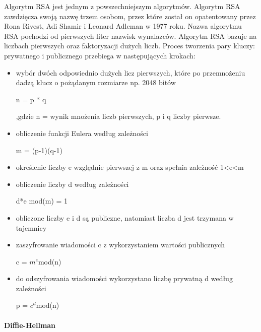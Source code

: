 \documentclass[12p]{article}
\begin{document}
Algorytm RSA jest jednym z powszechniejszym algorytmów. Algorytm RSA zawdzięcza swoją nazwę trzem osobom, przez które został on opatentowany przez Rona Rivest, Adi Shamir i Leonard Adleman w 1977 roku. Nazwa algorytmu RSA pochodzi od pierwszych liter nazwisk wynalazców. Algorytm RSA bazuje na liczbach pierwszych oraz faktoryzacji dużych liczb. Proces tworzenia pary kluczy: prywatnego i publicznego przebiega w następujących krokach:
\begin{itemize}
\item wybór dwóch odpowiednio dużych licz pierwszych, które po przemnożeniu dadzą klucz o pożądanym rozmiarze np. 2048 bitów
\begin{center}
n = p * q 
\end{center}
,gdzie n = wynik mnożenia liczb pierwszych, p i q liczby pierwsze.
\item obliczenie funkcji Eulera według zależności
\begin{center}
m = (p-1)(q-1)
\end{center}
\item określenie liczby e względnie pierwszej z m oraz spełnia zależność 1<e<m
\item obliczenie liczby d według zależności
\begin{center}
d*e mod(m) = 1
\end{center}
\item obliczone liczby e i d są publiczne, natomiast liczba d jest trzymana w tajemnicy
\item zaszyfrowanie wiadomości c z wykorzystaniem wartości publicznych
\begin{center}
c = $m^{e}$mod(n)
\end{center}
\item do odszyfrowania wiadomości wykorzystano liczbę prywatną d według zależności
\begin{center}
p = $c^{d}$mod(n)
\end{center}
\end{itemize}
 
 
 
\paragraph{Diffie-Hellman} \mbox{} \\
\end{document}
